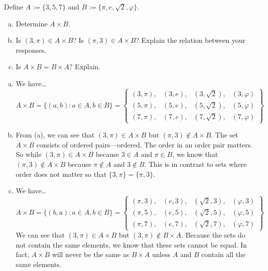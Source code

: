 \documentclass[11pt,letterpaper]{article}
\begin{document}
\newpage



 Define $A:= \{ 3, 5, 7 \}$ and $B:= \{ \pi, e, \sqrt{2}, \varphi \}$. 
	\begin{enumerate}[(a)]
	\item Determine $A \times B$.
	\item Is $(3, \pi) \in A \times B$? Is $(\pi, 3) \in A \times B$? Explain the relation between your responses. 
	\item Is $A \times B= B \times A$? Explain. 
	\end{enumerate} \pspace

\sol 
\begin{enumerate}[(a)]
\item We have\dots
	\[
	A \times B= \{ (a, b) \colon a \in A, b \in B \}= 
	\left\{
	\begin{matrix}
	(3, \pi), & (3, e), & (3, \sqrt{2}), & (3, \varphi) \\
	(5, \pi), & (5, e), & (5, \sqrt{2}), & (5, \varphi) \\
	(7, \pi), & (7, e), & (7, \sqrt{2}), & (7, \varphi)	
	\end{matrix}
	\right\}
	\] \pspace

\item From (a), we can see that $(3, \pi) \in A \times B$ but $(\pi, 3) \notin A \times B$. The set $A \times B$ consists of ordered pairs---ordered. The order in an order pair matters. So while $(3, \pi) \in A \times B$ because $3 \in A$ and $\pi \in B$, we know that $(\pi, 3) \notin A \times B$ because $\pi \notin A$ and $3 \notin B$. This is in contrast to sets where order does not matter so that $\{ 3, \pi \}= \{ \pi, 3 \}$. \pspace

\item We have\dots
	\[
	A \times B= \{ (b, a) \colon a \in A, b \in B \}= 
	\left\{
	\begin{matrix}
	(\pi, 3), & (e, 3), & (\sqrt{2}, 3), & (\varphi, 3) \\	
	(\pi, 5), & (e, 5), & (\sqrt{2}, 5), & (\varphi, 5) \\	
	(\pi, 7), & (e, 7), & (\sqrt{2}, 7), & (\varphi, 7) 
	\end{matrix}
	\right\}
	\] 
We can see that $(3, \pi) \in A \times B$ but $(3, \pi) \notin B \times A$. Because the sets do not contain the same elements, we know that these sets cannot be equal. In fact, $A \times B$ will never be the same as $B \times A$ unless $A$ and $B$ contain all the same elements. 
\end{enumerate}
\end{document}
